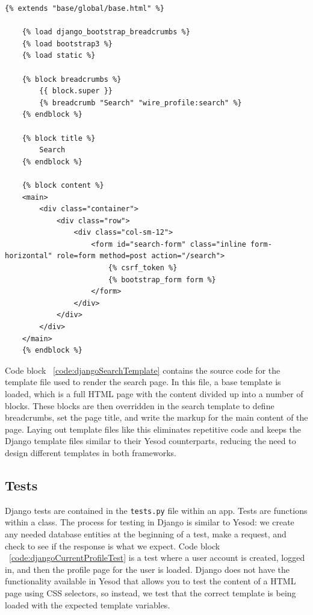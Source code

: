 \begin{lstlisting}[caption={Template file for the search page},label={code:djangoSearchTemplate}]
    {% extends "base/global/base.html" %}

    {% load django_bootstrap_breadcrumbs %}
    {% load bootstrap3 %}
    {% load static %}
    
    {% block breadcrumbs %}
        {{ block.super }}
        {% breadcrumb "Search" "wire_profile:search" %}
    {% endblock %}
    
    {% block title %}
        Search
    {% endblock %}
    
    {% block content %}
    <main>
        <div class="container">
            <div class="row">
                <div class="col-sm-12">
                    <form id="search-form" class="inline form-horizontal" role=form method=post action="/search">
                        {% csrf_token %}
                        {% bootstrap_form form %}
                    </form>
                </div>
            </div>
        </div>
    </main>
    {% endblock %}
\end{lstlisting}

Code block ~\ref{code:djangoSearchTemplate} contains the source code for the
template file used to render the search page. In this file, a base template
is loaded, which is a full HTML page with the content divided up
into a number of blocks. These blocks are then overridden in the search template
to define breadcrumbs, set the page title, and write the markup for the main
content of the page. Laying out template files like this eliminates repetitive
code and keeps the Django template files similar to their Yesod counterparts,
reducing the need to design different templates in both frameworks.

\subsection{Tests}

Django tests are contained in the \texttt{tests.py} file within an app. Tests
are functions within a class. The process for testing in Django is similar to
Yesod: we create any needed database entities at the beginning of a test,
make a request, and check to see if the response is what we expect. Code
block ~\ref{code:djangoCurrentProfileTest} is a test where a user account
is created, logged in, and then the profile page for the user is loaded.
Django does not have the functionality available in Yesod that allows you
to test the content of a HTML page using CSS selectors, so instead, we test
that the correct template is being loaded with the expected template variables.

